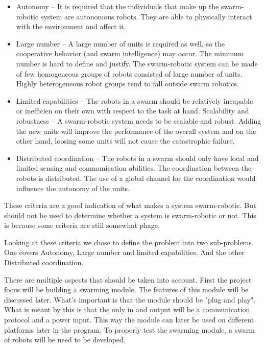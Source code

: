 \documentclass[10pt,a4paper]{article}
\begin{document}
\begin{itemize}
    \item Autonomy – It is required that the individuals that make up   the swarm-robotic system are autonomous robots. They are able to        physically      interact with the environment and affect it.
    \item Large number – A large number of units is required
    as well, so the cooperative behavior (and
    swarm intelligence) may occur. The minimum number
    is hard to define and justify. The swarm-robotic
    system can be made of few homogeneous groups of
    robots consisted of large number of units. Highly heterogeneous 
    robot groups tend to fall outside swarm
    robotics.
    \item Limited capabilities – The robots in a swarm
    should be relatively incapable or inefficien on their
    own with respect to the task at hand.
    Scalability and robustness – A swarm-robotic
    system needs to be scalable and robust. Adding the
    new units will improve the performance of the overall
    system and on the other hand, loosing some units will
    not cause the catastrophic failure.
    \item Distributed coordination – The robots in a swarm
    should only have local and limited sensing and communication
    abilities. The coordination between the
    robots is distributed. The use of a global channel for
    the coordination would influence the autonomy of the
    units.
\end{itemize}

These criteria are a good indication of what makes a system swarm-robotic. But should not be used to determine whether a system is swarm-robotic or not. This is because some criteria are still somewhat phage\cite{swarmintelligence}.

Looking at these criteria we chose to define the problem into two sub-problems. One covers Autonomy, Large number and limited capabilities. And the other Distributed coordination. 

There are multiple aspects that should be taken into account. First the project focus will be building a swarming module. The features of this module will be discussed later. What's important is that the module should be "plug and play". What is meant by this is that the only in and output will be a communication protocol and a power input. This way the module can later be used on different platforms later in the program. To properly test the swarming module, a swarm of robots will be need to be developed.
\end{document}
